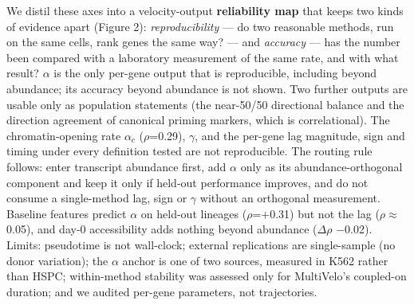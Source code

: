 \documentclass[10pt,twocolumn]{article}
\begin{document}
We distil these axes into a velocity-output \textbf{reliability map} that keeps two kinds of evidence apart (Figure 2): \emph{reproducibility} --- do two reasonable methods, run on the same cells, rank genes the same way? --- and \emph{accuracy} --- has the number been compared with a laboratory measurement of the same rate, and with what result? $\alpha$ is the only per-gene output that is reproducible, including beyond abundance; its accuracy beyond abundance is not shown. Two further outputs are usable only as population statements (the near-50/50 directional balance and the direction agreement of canonical priming markers, which is correlational). The chromatin-opening rate $\alpha_c$ ($\rho$=0.29), $\gamma$, and the per-gene lag magnitude, sign and timing under every definition tested are not reproducible. The routing rule follows: enter transcript abundance first, add $\alpha$ only as its abundance-orthogonal component and keep it only if held-out performance improves, and do not consume a single-method lag, sign or $\gamma$ without an orthogonal measurement. Baseline features predict $\alpha$ on held-out lineages ($\rho$=+0.31) but not the lag ($\rho$$\approx$0.05), and day-0 accessibility adds nothing beyond abundance ($\Delta$$\rho$ $-$0.02). Limits: pseudotime is not wall-clock; external replications are single-sample (no donor variation); the $\alpha$ anchor is one of two sources, measured in K562 rather than HSPC; within-method stability was assessed only for MultiVelo's coupled-on duration; and we audited per-gene parameters, not trajectories.
\end{document}
